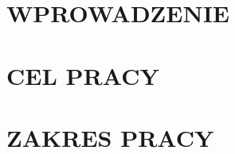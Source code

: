 \section*{\MakeUppercase{Wprowadzenie}}

\lipsum[1]

\section*{\MakeUppercase{Cel pracy}}

\lipsum[1]

\section*{\MakeUppercase{Zakres pracy}}

\lipsum[1]
